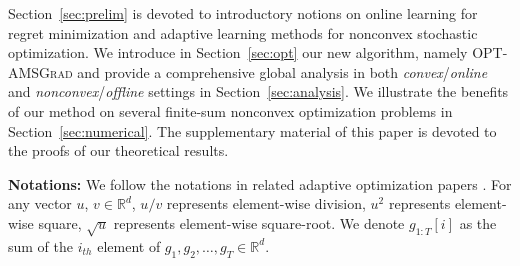 \documentclass[11pt]{article}
\theoremstyle{k}
\begin{document}
Section~\ref{sec:prelim} is devoted to introductory notions on online learning for regret minimization and adaptive learning methods for nonconvex stochastic optimization. We introduce in Section~\ref{sec:opt} our new algorithm, namely \textsc{OPT-AMSGrad} and provide a comprehensive global analysis in both \emph{convex}/\emph{online}  and \emph{nonconvex}/\emph{offline} settings in Section~\ref{sec:analysis}.
We illustrate the benefits of our method on several finite-sum nonconvex optimization problems in Section~\ref{sec:numerical}.
The supplementary material of this paper is devoted to the proofs of our theoretical results.

\textbf{Notations:} We follow the notations in related adaptive optimization papers \citep{KB15,RKK18}. For any vector $u$, $v \in \mathbb R^{d}$,  $u/v$ represents element-wise division,
$u^{2}$ represents element-wise square, $\sqrt{u}$ represents element-wise square-root.
We denote $g_{1:T}[i]$ as the sum of the $i_{th}$ element of $g_{1}, g_{2},
\dots, g_{T} \in \mathbb R^{d}$.
\end{document}
